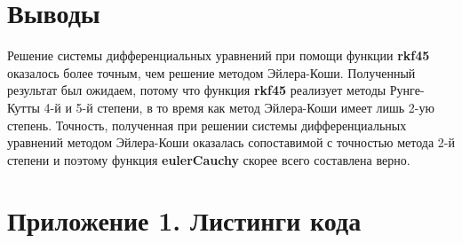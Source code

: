 \section{Выводы}

Решение системы дифференциальных уравнений при помощи функции \textbf{rkf45} оказалось более точным, чем решение методом Эйлера-Коши. Полученный результат был ожидаем, потому что функция \textbf{rkf45} реализует методы Рунге-Кутты 4-й и 5-й степени, в то время как метод Эйлера-Коши имеет лишь 2-ую степень. Точность, полученная при решении системы дифференциальных уравнений методом Эйлера-Коши оказалась сопоставимой с точностью метода 2-й степени и поэтому функция \textbf{eulerCauchy} скорее всего составлена верно.

\newpage

\section*{Приложение 1. Листинги кода}


\parindent=1cm


\parindent=1cm


